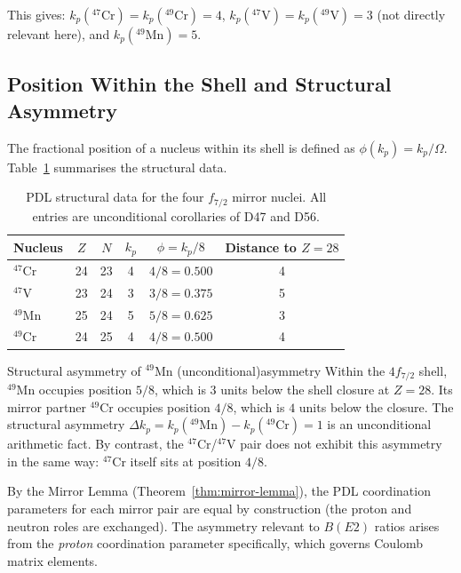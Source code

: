 \documentclass[12pt,a4paper]{article}
\theoremstyle{remark}
\begin{document}
This gives: $k_p(^{47}\text{Cr}) = k_p(^{49}\text{Cr}) = 4$, $k_p(^{47}\text{V}) = k_p(^{49}\text{V}) = 3$ (not directly relevant here), and $k_p(^{49}\text{Mn}) = 5$.

\subsection{Position Within the Shell and Structural Asymmetry}
\label{ssec:position}

The fractional position of a nucleus within its shell is defined as $\phi(k_p) = k_p / \Omega$. Table~\ref{tab:struct} summarises the structural data.

\begin{table}[h]
\centering
\caption{PDL structural data for the four $f_{7/2}$ mirror nuclei. All entries are unconditional corollaries of D47 and D56.}
\label{tab:struct}
\begin{tabular}{lccccc}
\toprule
Nucleus & $Z$ & $N$ & $k_p$ & $\phi = k_p/8$ & Distance to $Z=28$ \\
\midrule
$^{47}$Cr & 24 & 23 & 4 & $4/8 = 0.500$ & 4 \\
$^{47}$V  & 23 & 24 & 3 & $3/8 = 0.375$ & 5 \\
$^{49}$Mn & 25 & 24 & 5 & $5/8 = 0.625$ & 3 \\
$^{49}$Cr & 24 & 25 & 4 & $4/8 = 0.500$ & 4 \\
\bottomrule
\end{tabular}
\end{table}

\begin{pdlcorollary}{Structural asymmetry of $^{49}$Mn (unconditional)}{asymmetry}
Within the $4f_{7/2}$ shell, $^{49}$Mn occupies position $5/8$, which is $3$ units below the shell closure at $Z = 28$. Its mirror partner $^{49}$Cr occupies position $4/8$, which is $4$ units below the closure. The structural asymmetry $\Delta k_p = k_p(^{49}\text{Mn}) - k_p(^{49}\text{Cr}) = 1$ is an unconditional arithmetic fact. By contrast, the $^{47}$Cr/$^{47}$V pair does not exhibit this asymmetry in the same way: $^{47}$Cr itself sits at position $4/8$.
\end{pdlcorollary}

By the Mirror Lemma (Theorem~\ref{thm:mirror-lemma}), the PDL coordination parameters for each mirror pair are equal by construction (the proton and neutron roles are exchanged). The asymmetry relevant to $B(E2)$ ratios arises from the \emph{proton} coordination parameter specifically, which governs Coulomb matrix elements.
\end{document}
